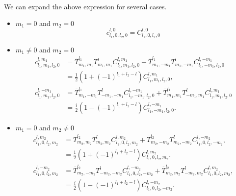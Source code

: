 \documentclass[onecolumn,11pt]{IEEEtran}
\begin{document}
We can expand the above expression for several cases.

\begin{itemize}
    \item $m_1=0$ and $m_2=0$
        $$c^{l,0}_{l_1,0,l_2,0} =  C^{l,0}_{l_1,0,l_2,0}$$

    \item $m_1\neq 0$ and $m_2 = 0$
        \begin{align*}
            c^{l,m_1}_{l_1,m_1,l_2,0} & =  \overline T^{l_1}_{m_1,m_1}  T^l_{m_1,m_1} C^{l,m_1}_{l_1,m_1,l_2,0} + \overline T^{l_1}_{m_1,-m_1}  T^l_{m_1,-m_1} C^{l,-m_1}_{l_1,-m_1,l_2,0} \\
                                      & = \frac{1}{2}(1+(-1)^{l_1+l_2-l}) C^{l,m_1}_{l_1,m_1,l_2,0},\\
            c^{l,-m_1}_{l_1,m_1,l_2,0} & =  \overline T^{l_1}_{m_1,-m_1}  T^l_{-m_1,-m_1} C^{l,-m_1}_{l_1,-m_1,l_2,0} + \overline T^{l_1}_{m_1,m_1}  T^l_{-m_1,m_1} C^{l,m_1}_{l_1,m_1,l_2,0} \\
                                      & = \frac{i}{2}(1-(-1)^{l_1+l_2-l}) C^{l,-m_1}_{l_1,-m_1,l_2,0}.
        \end{align*}

    \item $m_1 = 0$ and $m_2\neq 0$
        \begin{align*}
            c^{l,m_2}_{l_1,0,l_2,m_2} & =  \overline T^{l_2}_{m_2,m_2} T^l_{m_2,m_2} C^{l,m_2}_{l_1,0,l_2,m_2} +  \overline T^{l_2}_{m_2,-m_2} T^l_{m_2,-m_2} C^{l,-m_2}_{l_1,0,l_2,-m_2} ,\\
                                      & = \frac{1}{2}(1+(-1)^{l_1+l_2-l}) C^{l,m_2}_{l_1,0,l_2,m_2},\\
            c^{l,-m_2}_{l_1,0,l_2,m_2} & =  \overline T^{l_2}_{m_2,-m_2} T^l_{-m_2,-m_2} C^{l,-m_2}_{l_1,0,l_2,-m_2} +  \overline T^{l_2}_{m_2,m_2} T^l_{-m_2,m_2} C^{l,m_2}_{l_1,0,l_2,m_2} ,\\
                                      & = \frac{i}{2}(1-(-1)^{l_1+l_2-l}) C^{l,-m_2}_{l_1,0,l_2,-m_2}.
        \end{align*}


\end{itemize}
\end{document}

